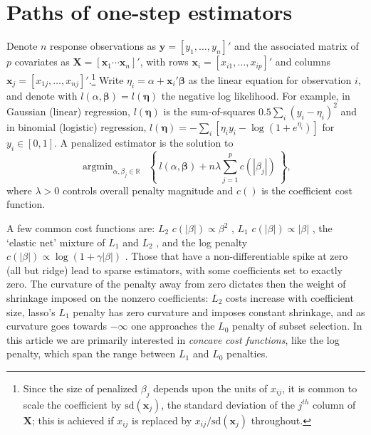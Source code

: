 \documentclass[twoside]{article}
\DeclareMathOperator*{\argmin}{argmin}
\newcommand{\bs}[1]{\boldsymbol{#1}}
\newcommand{\mr}[1]{\mathrm{#1}}
\newcommand{\bm}[1]{\mathbf{#1}}
\newcommand{\ds}[1]{\mathds{#1}}
\begin{document}
\section{Paths of one-step estimators}
\label{sec:algos}

Denote $n$ response observations as $\bm{y} = [y_1,\ldots,y_n]'$ and the associated matrix of $p$ covariates as $\bm{X} =
[\bm{x}_1 \cdots \bm{x}_n]'$, with rows $\bm{x}_i = [x_{i1},\ldots,x_{ip}]'$ and columns $\bs{x}_j = [x_{1j},\ldots,x_{nj}]'$.\footnote{Since the size of penalized $\beta_j$ depends upon the units of $x_{ij}$,  it is common to scale
the coefficient by $\mr{sd}(\bs{x}_j)$, the standard deviation of the $j^{th}$ column
of $\bm{X}$; this is achieved if $x_{ij}$ is replaced by $x_{ij}/\mr{sd}(\bs{x}_j)$
throughout.} Write $\eta_{i} =
\alpha+\bm{x}_i'\bs{\beta}$ as the linear equation for observation $i$, and
denote with $l(\alpha, \bs{\beta}) = l(\bs{\eta})$  the negative log likelihood.  For example, in Gaussian (linear)
regression, $l(\bs{\eta})$ is the sum-of-squares $0.5\sum_i \left(y_i - \eta_i\right)^2$ and in binomial (logistic)
regression,  $l(\bs{\eta}) = -\sum_i \left[\eta_iy_i -
\log(1+e^{\eta_i})\right]$ for $y_i \in [0,1]$. A penalized estimator is  the
solution to
\begin{equation} \label{pendev}
\argmin_{\alpha,\beta_j\in\ds{R}}~~\left\{~l(\alpha,{\bs{\beta}}) + n\lambda \sum_{j=1}^p c(|\beta_j|)~\right\},
\end{equation}
where $\lambda>0$ controls overall penalty magnitude and  $c()$ is the  coefficient cost function.
 
A few common cost functions are: 
$L_2$ $c(|\beta|) \propto \beta^2$ \citep[ridge,][]{hoerl_ridge_1970}, $L_1$ $c(|\beta|) \propto |\beta|$ \citep[lasso,][]{tibshirani_regression_1996}, the `elastic net' mixture of $L_1$ and $L_2$ \citep{zou_regularization_2005}, and the log penalty $c(|\beta|) \propto \log(1+\gamma|\beta|)$ \citep{candes_enhancing_2008}.  Those that have
a non-differentiable spike at zero (all but ridge) lead to sparse estimators,
with some coefficients set to exactly zero.   The curvature of the penalty
away from zero dictates then the weight of shrinkage imposed on the nonzero
coefficients:  $L_2$ costs increase with coefficient size,  lasso's $L_1$
penalty has zero curvature and imposes constant shrinkage, and as curvature
goes towards $-\infty$ one approaches the $L_0$ penalty of subset selection.
In this article we are primarily interested in {\it concave cost functions},
like the log penalty, which span the range between $L_1$ and $L_0$ penalties.
\end{document}
